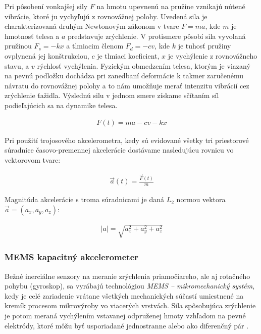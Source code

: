 Pri pôsobení vonkajšej sily $F$ na hmotu upevnenú na pružine vznikajú nútené vibrácie, ktoré ju vychyľujú z rovnovážnej polohy. Uvedená sila je charakterizovaná druhým Newtonovým zákonom v tvare $F = ma$, kde $m$ je hmotnosť telesa a $a$ predstavuje zrýchlenie. V protismere pôsobí sila vyvolaná pružinou $F_s = -kx$ a tlmiacim členom $F_d = -cv$, kde $k$ je tuhosť pružiny ovplynená jej konštrukciou, $c$ je tlmiaci koeficient, $x$ je vychýlenie z rovnovážneho stavu, a $v$ rýchlosť vychýlenia. Fyzickým obmedzením  telesa, ktorým je viazaný na pevnú podložku dochádza pri zanedbaní deformácie k takmer zaručenému návratu do rovnovážnej polohy a to nám umožňuje merať intenzitu vibrácií cez zrýchlenie ťažidla. Výslednú silu v jednom smere získame sčítaním síl podieľajúcich sa na dynamike telesa.
\begin{ceqn}\begin{align}
 	F(t) = ma - cv - kx
\end{align}\end{ceqn}
Pri použití trojosového akcelerometra, kedy sú evidované všetky tri priestorové súradnice časovo-premennej akcelerácie dostávame
nasledujúcu rovnicu vo vektorovom tvare:
\begin{ceqn}\begin{align}
   \vec{a}(t) = \frac{\vec{F}(t)}{m}
\end{align}\end{ceqn}
Magnitúda akcelerácie s troma súradnicami je daná $L_2$ normou vektora $\vec{a} = (a_x, a_y, a_z)$:
\begin{ceqn}\begin{align}
   |a| = \sqrt{a_x^2 + a_y^2 + a_z^2}
\end{align}\end{ceqn}

\subsubsection{MEMS kapacitný akcelerometer}
Bežné inerciálne senzory na meranie zrýchlenia priamočiareho, ale aj rotačného pohybu (gyroskop), sa vyrábajú technológiou
\emph{MEMS – mikromechanický systém}, kedy je celé zariadenie vrátane všetkých mechanických súčastí umiestnené na kremík procesom
mikrovýroby vo viacerých vrstvách. Sila spôsobujúca zrýchlenie je potom meraná vychýlením vstavanej odpruženej hmoty vzhľadom
na pevné elektródy, ktoré môžu byť usporiadané jednostranne alebo ako diferenčný pár \cite{mdof-mems-accelerometers}.

